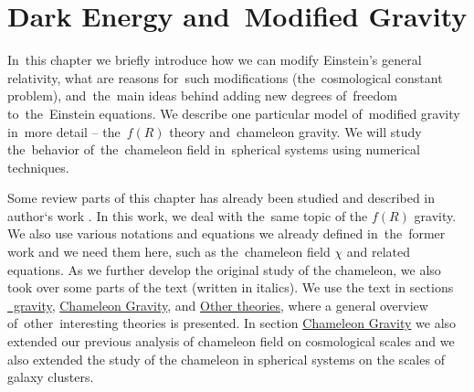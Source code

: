 \chapter{Dark Energy and~Modified Gravity}
\label{chpt:de_mg}
In~this chapter we briefly introduce how we can modify Einstein's general relativity, what are reasons for~such modifications (the~cosmological constant problem), and~the~main ideas behind adding new degrees of~freedom to~the~Einstein equations. We describe one particular model of~modified gravity in~more detail -- the~$f(R)$ theory and~chameleon gravity. We will study the~behavior of~the~chameleon field in~spherical systems using numerical techniques.

Some review parts of this chapter has already been studied and described in author`s work \textcite{mastersthesis_vrastil}. In this work, we deal with the~same topic of the $f(R)$ gravity. We also use various notations and equations we already defined in~the~former work and we need them here, such as the~chameleon field $\chi$ and related equations. As we further develop the original study of the chameleon, we also took over some parts of the text (written in italics). We use the text in sections \hyperref[sec:fR]{\fR\ gravity}, \hyperref[sec_cham]{Chameleon Gravity}, and \hyperref[sec:other]{Other theories}, where a general overview of~other~interesting theories is presented. In section \hyperref[sec_cham]{Chameleon Gravity} we also extended our previous analysis of chameleon field on cosmological scales and we also extended the study of the chameleon in spherical systems on the scales of galaxy clusters.







